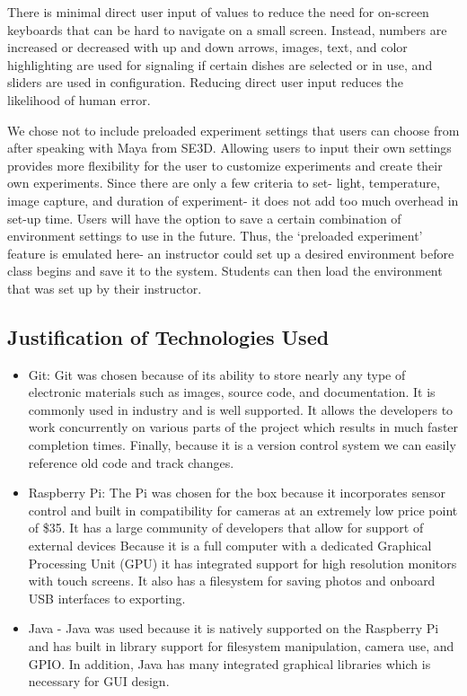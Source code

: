 There is minimal direct user input of values to reduce the need for on-screen keyboards that can be hard to navigate on a small screen. Instead, numbers are increased or decreased with up and down arrows, images, text, and color highlighting are used for signaling if certain dishes are selected or in use, and sliders are used in configuration. Reducing direct user input reduces  the likelihood of human error.

We chose not to include preloaded experiment settings that users can choose from after speaking with Maya from SE3D. Allowing users to input their own settings provides more flexibility for the user to customize experiments and create their own experiments. Since there are only a few criteria to set- light, temperature, image capture, and duration of experiment- it does not add too much overhead in set-up time. Users will have the option to save a certain combination of environment settings to use in the future. Thus, the `preloaded experiment' feature is emulated here- an instructor could set up a desired environment before class begins and save it to the system. Students can then load the environment that was set up by their instructor. 


\subsection{Justification of Technologies Used}
\begin{itemize}
	\item Git: Git was chosen because of its ability to store nearly any type of electronic materials such as images, source code, and documentation. It is commonly used in industry and is well supported. It allows the developers to work concurrently on various parts of the project which results in much faster completion times. Finally, because it is a version control system we can easily reference old code and track changes.

	\item Raspberry Pi: The Pi was chosen for the box because it incorporates sensor control and built in compatibility for cameras at an extremely low price point of \$35. It has a large community of developers that allow for support of external devices Because it is a full computer with a dedicated Graphical Processing Unit (GPU) it has integrated support for high resolution monitors with touch screens. It also has a filesystem for saving photos and onboard USB interfaces to exporting.

	\item Java - Java was used because it is natively supported on the Raspberry Pi and has built in library support for filesystem manipulation, camera use, and GPIO. In addition, Java has many integrated graphical libraries which is necessary for GUI design.
\end{itemize}
